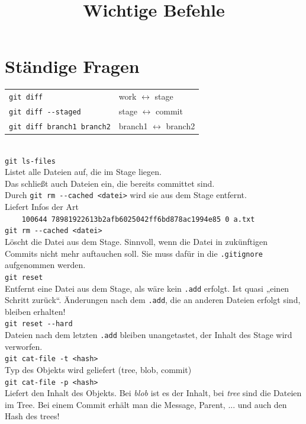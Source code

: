 \documentclass[oneside]{scrreprt}
\title{Wichtige Befehle}
\begin{document}
\section*{Ständige Fragen}

\begin{tabular}{ll}
    \verb+git diff+ & work $\leftrightarrow$ stage\\
    \verb+git diff --staged+ & stage $\leftrightarrow$ commit\\
    \verb+git diff branch1 branch2+ & branch1 $\leftrightarrow$ branch2\\
\end{tabular}
~\\

\verb+git ls-files+ \\
Listet alle Dateien auf, die im Stage liegen. \\
Das schließt auch Dateien ein, die bereits committet sind. \\ 
Durch \verb+git rm --cached <datei>+ wird sie aus dem Stage entfernt.\\
Liefert Infos der Art\\
\verb+    100644 78981922613b2afb6025042ff6bd878ac1994e85 0	a.txt+
~\\ 
 
\verb+git rm --cached <datei>+\\
Löscht die Datei aus dem Stage. Sinnvoll, wenn die Datei in
zukünftigen Commits nicht mehr auftauchen soll. Sie muss dafür 
in die \verb+.gitignore+ aufgenommen werden.
~\\

\verb+git reset+\\
Entfernt eine Datei aus dem Stage, als wäre kein \verb+.add+ erfolgt. Ist quasi „einen Schritt zurück“.
Änderungen nach dem \verb+.add+, die an anderen Dateien erfolgt sind, bleiben erhalten!
~\\

\verb+git reset --hard+\\
Dateien nach dem letzten \verb+.add+ bleiben unangetastet, 
der Inhalt des Stage wird verworfen.
~\\

\verb+git cat-file -t <hash>+\\
Typ des Objekts wird geliefert (tree, blob, commit)
~\\

\verb+git cat-file -p <hash>+\\
Liefert den Inhalt des Objekts. Bei \emph{blob} ist es der Inhalt, bei \emph{tree} sind die Dateien im Tree.
Bei einem Commit erhält man die Message, Parent, ... und auch den Hash des trees! 
\end{document}
